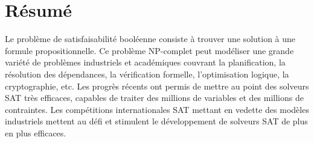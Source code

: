 %
%
%
%


\chapter*{Résumé}

Le problème de satisfaisabilité booléenne consiste à trouver une solution à une formule  propositionnelle.
Ce problème NP-complet peut modéliser une grande variété de problèmes industriels et académiques couvrant la planification, la résolution des dépendances, la vérification formelle, l'optimisation logique, la cryptographie, etc.
Les  progrès récents ont permis de mettre au point des solveurs SAT très efficaces, capables de traiter des millions de variables et des millions de contraintes. 
Les compétitions internationales SAT mettant en vedette des modèles industriels mettent au défi et stimulent le développement de solveurs SAT de plus en plus efficaces.


